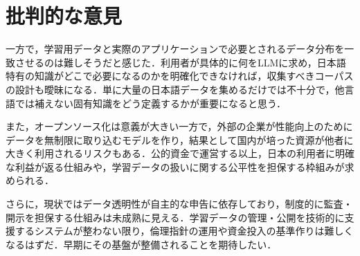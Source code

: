 \section{批判的な意見}
一方で，学習用データと実際のアプリケーションで必要とされるデータ分布を一致させるのは難しそうだと感じた．利用者が具体的に何をLLMに求め，日本語特有の知識がどこで必要になるのかを明確化できなければ，収集すべきコーパスの設計も曖昧になる．単に大量の日本語データを集めるだけでは不十分で，他言語では補えない固有知識をどう定義するかが重要になると思う．

また，オープンソース化は意義が大きい一方で，外部の企業が性能向上のためにデータを無制限に取り込むモデルを作り，結果として国内が培った資源が他者に大きく利用されるリスクもある．公的資金で運営する以上，日本の利用者に明確な利益が返る仕組みや，学習データの扱いに関する公平性を担保する枠組みが求められる．

さらに，現状ではデータ透明性が自主的な申告に依存しており，制度的に監査・開示を担保する仕組みは未成熟に見える．学習データの管理・公開を技術的に支援するシステムが整わない限り，倫理指針の運用や資金投入の基準作りは難しくなるはずだ．早期にその基盤が整備されることを期待したい．